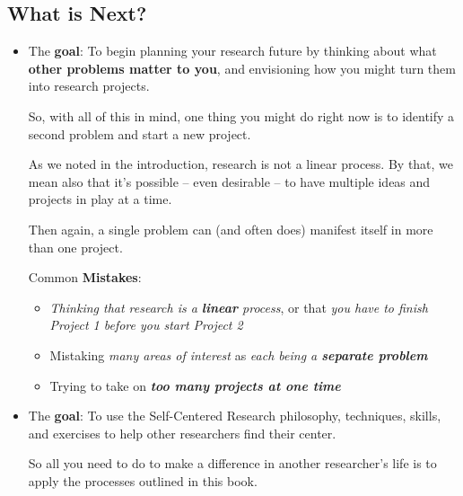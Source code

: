 \documentclass[11pt]{article}
\begin{document}
\subsection{What is Next?}
\begin{itemize}
\item \begin{exercise}
The \textbf{goal}: To begin planning your research future by thinking about what \textbf{other problems matter to you}, and envisioning how you might turn them into research projects.

So, with all of this in mind, one thing you might do right now is to identify a second problem and start a new project.

As we noted in the introduction, research is not a linear process. By that, we mean also that it’s possible -- even desirable -- to have multiple ideas and projects in play at a time.

Then again, a single problem can (and often does) manifest itself in more than one project. 
\end{exercise}
Common \textbf{Mistakes}:
\begin{itemize}
\item \emph{Thinking that research is a \textbf{linear} process}, or that \emph{you have to finish Project 1 before you start Project 2}

\item Mistaking \emph{many areas of interest} as \emph{each being a \textbf{separate problem}}

\item Trying to take on \emph{\textbf{too many projects at one time}}
\end{itemize}


\vspace{20pt}
\item \begin{exercise}
The \textbf{goal}: To use the Self-Centered Research philosophy, techniques, skills, and exercises to help other researchers find their center.

So all you need to do to make a difference in another researcher’s life is to apply the processes outlined in this book. 


\end{exercise}
\end{itemize}
\end{document}
